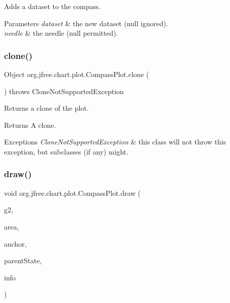 Adds a dataset to the compass.


\begin{DoxyParams}{Parameters}
{\em dataset} & the new dataset ({\ttfamily null} ignored). \\
\hline
{\em needle} & the needle ({\ttfamily null} permitted). \\
\hline
\end{DoxyParams}
\mbox{\label{classorg_1_1jfree_1_1chart_1_1plot_1_1_compass_plot_a68a4bc1b25766cd7b8b8dfd5b4ed574d}} 
\subsubsection{\texorpdfstring{clone()}{clone()}}
{\footnotesize\ttfamily Object org.\+jfree.\+chart.\+plot.\+Compass\+Plot.\+clone (\begin{DoxyParamCaption}{ }\end{DoxyParamCaption}) throws Clone\+Not\+Supported\+Exception}

Returns a clone of the plot.

\begin{DoxyReturn}{Returns}
A clone.
\end{DoxyReturn}

\begin{DoxyExceptions}{Exceptions}
{\em Clone\+Not\+Supported\+Exception} & this class will not throw this exception, but subclasses (if any) might. \\
\hline
\end{DoxyExceptions}
\mbox{\label{classorg_1_1jfree_1_1chart_1_1plot_1_1_compass_plot_a4bbc7ab79ce22f7d626cd7618cc40005}} 
\subsubsection{\texorpdfstring{draw()}{draw()}}
{\footnotesize\ttfamily void org.\+jfree.\+chart.\+plot.\+Compass\+Plot.\+draw (\begin{DoxyParamCaption}\item[{Graphics2D}]{g2,  }\item[{Rectangle2D}]{area,  }\item[{Point2D}]{anchor,  }\item[{\mbox{\hyperlink{classorg_1_1jfree_1_1chart_1_1plot_1_1_plot_state}{Plot\+State}}}]{parent\+State,  }\item[{\mbox{\hyperlink{classorg_1_1jfree_1_1chart_1_1plot_1_1_plot_rendering_info}{Plot\+Rendering\+Info}}}]{info }\end{DoxyParamCaption})}

